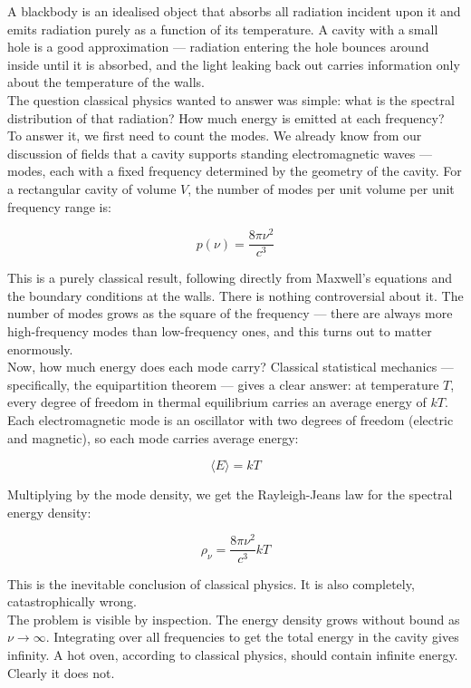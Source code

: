 \documentclass[krantz1,ChapterTOCs]{krantz}
\begin{document}
A blackbody is an idealised object that absorbs all radiation incident 
upon it and emits radiation purely as a function of its temperature. 
A cavity with a small hole is a good approximation --- radiation 
entering the hole bounces around inside until it is absorbed, and the 
light leaking back out carries information only about the temperature 
of the walls.\\

The question classical physics wanted to answer was simple: what is 
the spectral distribution of that radiation? How much energy is emitted 
at each frequency?\\

To answer it, we first need to count the modes. We already know from 
our discussion of fields that a cavity supports standing electromagnetic 
waves --- modes, each with a fixed frequency determined by the 
geometry of the cavity. For a rectangular cavity of volume $V$, the 
number of modes per unit volume per unit frequency range is:

$$p(\nu) = \frac{8\pi\nu^2}{c^3}$$

This is a purely classical result, following directly from Maxwell's 
equations and the boundary conditions at the walls. There is nothing 
controversial about it. The number of modes grows as the square of the 
frequency --- there are always more high-frequency modes than 
low-frequency ones, and this turns out to matter enormously.\\

Now, how much energy does each mode carry? Classical statistical 
mechanics --- specifically, the equipartition theorem --- gives a 
clear answer: at temperature $T$, every degree of freedom in thermal 
equilibrium carries an average energy of $kT$. Each electromagnetic 
mode is an oscillator with two degrees of freedom (electric and 
magnetic), so each mode carries average energy:

$$\langle E \rangle = kT$$

Multiplying by the mode density, we get the Rayleigh-Jeans law for 
the spectral energy density:

$$\rho_\nu = \frac{8\pi\nu^2}{c^3} kT$$

This is the inevitable conclusion of classical physics. It is also 
completely, catastrophically wrong.\\

The problem is visible by inspection. The energy density grows without 
bound as $\nu \to \infty$. Integrating over all frequencies to get 
the total energy in the cavity gives infinity. A hot oven, according 
to classical physics, should contain infinite energy. Clearly it does 
not.\\
\end{document}
